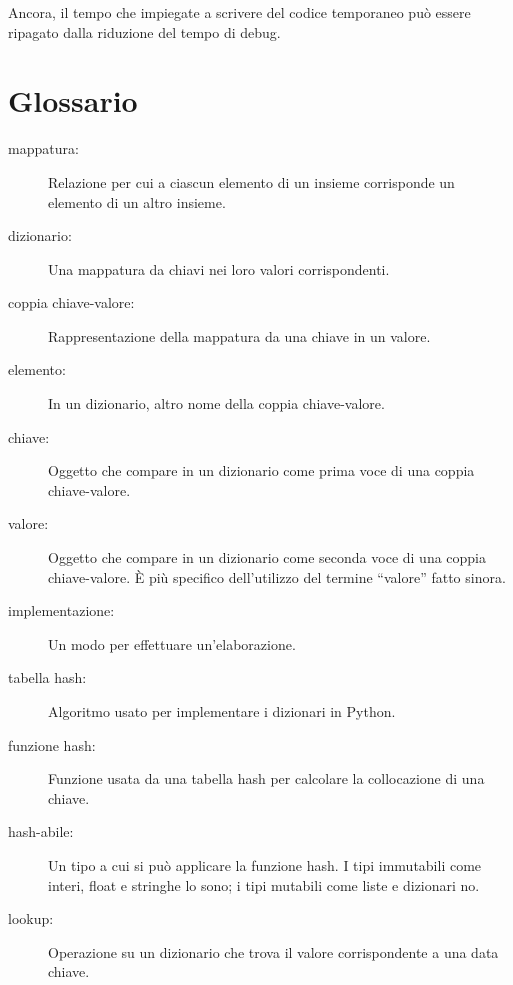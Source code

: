 \documentclass[10pt]{book}
\begin{document}
Ancora, il tempo che impiegate a scrivere del codice temporaneo può essere ripagato dalla riduzione del tempo di debug.

\section{Glossario}

\begin{description}

\item[mappatura:] Relazione per cui a ciascun elemento di un insieme corrisponde un elemento di un altro insieme.

\item[dizionario:] Una mappatura da chiavi nei loro valori corrispondenti.

\item[coppia chiave-valore:] Rappresentazione della mappatura da una chiave in un valore.

\item[elemento:] In un dizionario, altro nome della coppia chiave-valore.

\item[chiave:] Oggetto che compare in un dizionario come prima voce di una coppia chiave-valore.

\item[valore:] Oggetto che compare in un dizionario come seconda voce di una coppia chiave-valore. È più specifico dell'utilizzo del termine ``valore'' fatto sinora.

\item[implementazione:] Un modo per effettuare un'elaborazione.

\item[tabella hash:] Algoritmo usato per implementare i dizionari in Python.

\item[funzione hash:] Funzione usata da una tabella hash per calcolare la collocazione di una chiave.

\item[hash-abile:] Un tipo a cui si può applicare la funzione hash. I tipi immutabili come interi, float e stringhe lo sono; i tipi mutabili come liste e dizionari no.

\item[lookup:] Operazione su un dizionario che trova il valore corrispondente a una data chiave.


\end{description}
\end{document}
